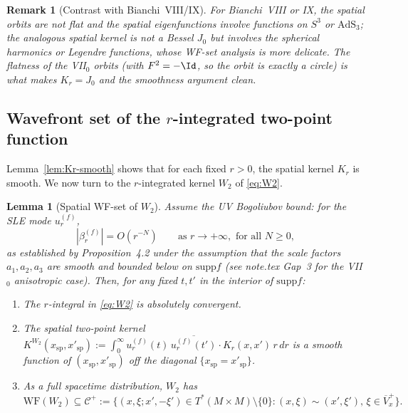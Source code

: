 \documentclass[12pt, a4paper]{article}
\newtheorem{lemma}[theorem]{Lemma}
\newtheorem{remark}[theorem]{Remark}
\theoremstyle{remark}
\newcommand{\WF}{\mathrm{WF}}
\newcommand{\supp}{\mathrm{supp}}
\begin{document}
\begin{remark}[Contrast with Bianchi~VIII/IX]\label{rem:B8}
  For Bianchi~VIII or IX, the spatial orbits are not flat and the
  spatial eigenfunctions involve functions on $S^3$ or $\mathrm{AdS}_3$;
  the analogous spatial kernel is not a Bessel $J_0$ but involves
  the spherical harmonics or Legendre functions, whose WF-set analysis
  is more delicate.  The flatness of the VII$_0$ orbits (with $F^2 = -\Id$,
  so the orbit is exactly a circle) is what makes $K_r = J_0$ and
  the smoothness argument clean.
\end{remark}

\subsection{Wavefront set of the $r$-integrated two-point function}

Lemma~\ref{lem:Kr-smooth} shows that for each fixed $r > 0$, the
spatial kernel $K_r$ is smooth.  We now turn to the $r$-integrated
kernel $W_2$ of \eqref{eq:W2}.

\begin{lemma}[Spatial WF-set of $W_2$]\label{lem:W2-spatial-WF}
  Assume the UV Bogoliubov bound: for the SLE mode $u_r^{(f)}$,
  \begin{equation}\label{eq:UV-bound}
    |\beta_r^{(f)}| = O(r^{-N}) \qquad \text{as } r \to +\infty,
    \text{ for all } N \ge 0,
  \end{equation}
  as established by \cite{BN23} Proposition~4.2 under the assumption
  that the scale factors $a_1, a_2, a_3$ are smooth and bounded below
  on $\supp f$ (see note.tex Gap~3 for the VII$_0$ anisotropic case).
  Then, for any fixed $t, t'$ in the interior of $\supp f$:
  \begin{enumerate}
    \item[(a)] The $r$-integral in \eqref{eq:W2} is absolutely convergent.
    \item[(b)] The spatial two-point kernel
      $K^{W_2}(x_{\mathrm{sp}}, x'_{\mathrm{sp}})
        := \int_0^\infty u_r^{(f)}(t)\,\overline{u_r^{(f)}(t')}
           \cdot K_r(x,x')\,r\,dr$
      is a smooth function of $(x_{\mathrm{sp}}, x'_{\mathrm{sp}})$
      off the diagonal $\{x_{\mathrm{sp}} = x'_{\mathrm{sp}}\}$.
    \item[(c)] As a full spacetime distribution, $W_2$ has
      \begin{equation}\label{eq:WF-inclusion}
        \WF(W_2) \subseteq \mathcal{C}^+ :=
          \{(x, \xi; x', {-\xi'}) \in T^*(M\!\times\!M)\setminus\{0\}
          : (x,\xi)\sim(x',\xi'),\,
          \xi \in \overline{V}^+_x\}.
      \end{equation}
  \end{enumerate}
\end{lemma}
\end{document}
